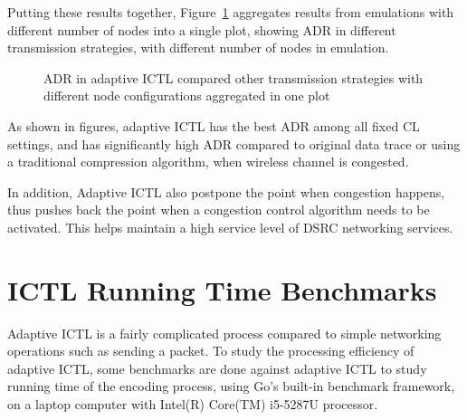 \documentclass[12pt]{report}
\begin{document}
Putting these results together, Figure~\ref{fig:adaptive_adr_aggr} aggregates results from emulations with different number of nodes into a single plot, showing ADR in different transmission strategies, with different number of nodes in emulation.

\begin{figure}[H]
  \caption{\label{fig:adaptive_adr_aggr}ADR in adaptive ICTL compared other transmission strategies with different node configurations aggregated in one plot}
\end{figure}

As shown in figures, adaptive ICTL has the best ADR among all fixed CL settings, and has significantly high ADR compared to original data trace or using a traditional compression algorithm, when wireless channel is congested.

In addition, Adaptive ICTL also postpone the point when congestion happens, thus pushes back the point when a congestion control algorithm needs to be activated. This helps maintain a high service level of DSRC networking services.

\section{ICTL Running Time Benchmarks}

Adaptive ICTL is a fairly complicated process compared to simple networking operations such as sending a packet. To study the processing efficiency of adaptive ICTL, some benchmarks are done against adaptive ICTL to study running time of the encoding process, using Go's built-in benchmark framework, on a laptop computer with Intel(R) Core(TM) i5-5287U processor.
\end{document}
